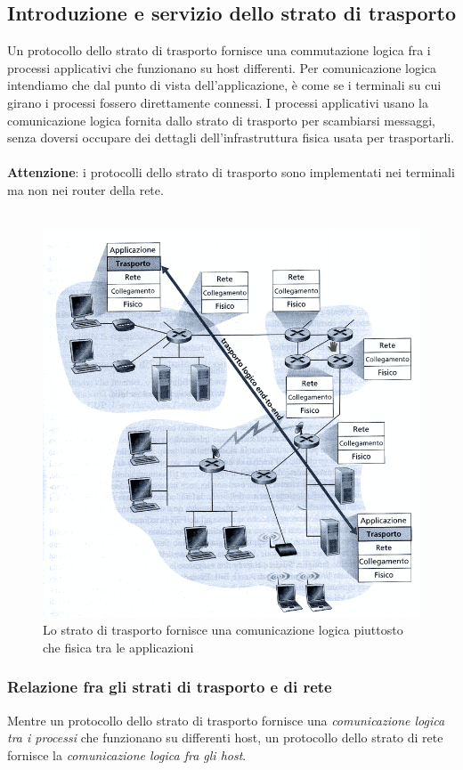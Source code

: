 \documentclass[11pt,a4paper]{article}
\begin{document}
\subsection{Introduzione e servizio dello strato di trasporto}
Un protocollo dello strato di trasporto fornisce una commutazione logica fra i processi applicativi che funzionano su host differenti. Per comunicazione logica intendiamo che dal punto di vista dell'applicazione, è come se i terminali su cui girano i processi fossero direttamente connessi. I processi applicativi usano la comunicazione logica fornita dallo strato di trasporto per scambiarsi messaggi, senza doversi occupare dei dettagli dell'infrastruttura fisica usata per trasportarli.\\ \\
\textbf{Attenzione}: i protocolli dello strato di trasporto sono implementati nei terminali ma non nei router della rete. \\ \\
\begin{figure}
	\includegraphics[scale=0.6]{img/009.png}
	\caption{Lo strato di trasporto fornisce una comunicazione logica piuttosto che fisica tra le applicazioni}
\end{figure}
\subsubsection{Relazione fra gli strati di trasporto e di rete}
Mentre un protocollo dello strato di trasporto fornisce una \emph{comunicazione logica tra i processi} che funzionano su differenti host, un protocollo dello strato di rete fornisce la \emph{comunicazione logica fra gli host}.
\end{document}
